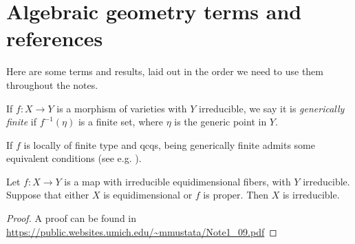 \documentclass[11pt]{amsart}
\begin{document}
\appendix
\section{Algebraic geometry terms and references}

Here are some terms and results, laid out in the order we need to use them throughout the notes.

\begin{definition}
\label{def:generically-finite}
If $f \colon X \to Y$ is a morphism of varieties with $Y$ irreducible, we say it is \textit{generically finite} if $f^{-1}(\eta)$ is a finite set, where $\eta$ is the generic point in $Y$.
\end{definition}

\begin{remark} If $f$ is locally of finite type and qcqs, being generically finite admits some equivalent conditions (see e.g. \cite[02NW]{Stacks}).
\end{remark}

\begin{proposition}\label{prop:irred-criterion}
Let $f\colon X\to Y$ is a map with irreducible equidimensional fibers, with $Y$ irreducible. Suppose that either $X$ is equidimensional or $f$ is proper. Then $X$ is irreducible.
\end{proposition}
\begin{proof} A proof can be found in \url{https://public.websites.umich.edu/~mmustata/Note1_09.pdf}
\end{proof}




\printbibliography
\end{document}
